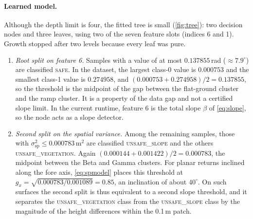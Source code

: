 \documentclass[11pt,a4paper]{article}
\begin{document}
\paragraph{Learned model.} Although the depth limit is four, the fitted tree is small (\cref{fig:tree}): two decision nodes and three leaves, using two of the seven feature slots (indices 6 and 1). Growth stopped after two levels because every leaf was pure.
\begin{enumerate}
  \item \emph{Root split on feature 6.} Samples with a value of at most $0.137855$\,rad ($\approx7.9^\circ$) are classified \textsc{safe}. In the dataset, the largest class-0 value is $0.000753$ and the smallest class-1 value is $0.274958$, and $(0.000753+0.274958)/2=0.137855$, so the threshold is the midpoint of the gap between the flat-ground cluster and the ramp cluster. It is a property of the data gap and not a certified slope limit. In the current runtime, feature 6 is the total slope $\beta$ of \eqref{eq:slope}, so the node acts as a slope detector.
  \item \emph{Second split on the spatial variance.} Among the remaining samples, those with $\sigma^2_{\mathrm{sp}}\le0.000783$\,m$^2$ are classified \textsc{unsafe\_slope} and the others \textsc{unsafe\_vegetation}. Again $(0.000144+0.001422)/2=0.000783$, the midpoint between the Beta and Gamma clusters. For planar returns inclined along the fore axis, \eqref{eq:spmodel} places this threshold at $g_x=\sqrt{0.000783/0.001089}=0.85$, an inclination of about $40^\circ$. On such surfaces the second split is thus equivalent to a second slope threshold, and it separates the \textsc{unsafe\_vegetation} class from the \textsc{unsafe\_slope} class by the magnitude of the height differences within the 0.1\,m patch.
\end{enumerate}
 
\end{document}
